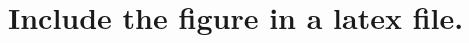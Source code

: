 \documentclass{article}
\begin{document}
\section{Include the figure in a latex file.}


\end{document}
